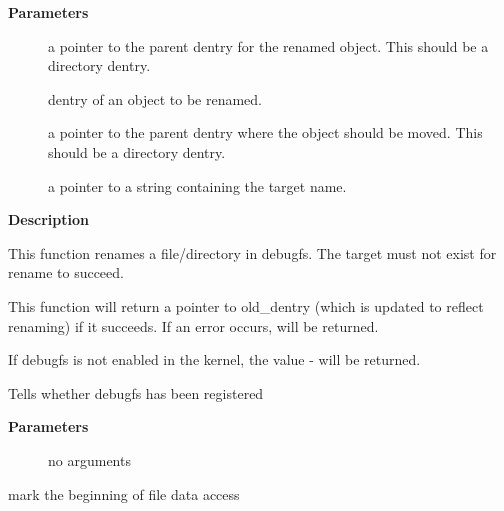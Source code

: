 \documentclass[a4paper,8pt,english]{sphinxmanual}
\begin{document}
\textbf{Parameters}
\begin{description}
\item[{}] \leavevmode
a pointer to the parent dentry for the renamed object. This
should be a directory dentry.

\item[{}] \leavevmode
dentry of an object to be renamed.

\item[{}] \leavevmode
a pointer to the parent dentry where the object should be
moved. This should be a directory dentry.

\item[{}] \leavevmode
a pointer to a string containing the target name.

\end{description}

\textbf{Description}

This function renames a file/directory in debugfs.  The target must not
exist for rename to succeed.

This function will return a pointer to old\_dentry (which is updated to
reflect renaming) if it succeeds. If an error occurs,  will be
returned.

If debugfs is not enabled in the kernel, the value - will be
returned.

\begin{fulllineitems}
\label{filesystems/index:c.debugfs_initialized}
Tells whether debugfs has been registered

\end{fulllineitems}


\textbf{Parameters}
\begin{description}
\item[{}] \leavevmode
no arguments

\end{description}

\begin{fulllineitems}
\label{filesystems/index:c.debugfs_file_get}
mark the beginning of file data access

\end{fulllineitems}
\end{document}
